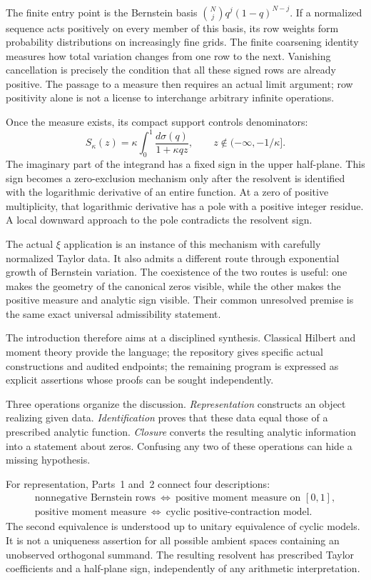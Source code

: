 The finite entry point is the Bernstein basis
$\binom Nj q^j(1-q)^{N-j}$. If a normalized sequence acts positively
on every member of this basis, its row weights form probability
distributions on increasingly fine grids. The finite coarsening
identity measures how total variation changes from one row to the
next. Vanishing cancellation is precisely the condition that all
these signed rows are already positive. The passage to a measure then
requires an actual limit argument; row positivity alone is not a
license to interchange arbitrary infinite operations.

Once the measure exists, its compact support controls denominators:
\[
 S_\kappa(z)=\kappa\int_0^1\frac{d\sigma(q)}{1+\kappa qz},
 \qquad z\notin(-\infty,-1/\kappa].
\]
The imaginary part of the integrand has a fixed sign in the upper
half-plane. This sign becomes a zero-exclusion mechanism only after
the resolvent is identified with the logarithmic derivative of an
entire function. At a zero of positive multiplicity, that logarithmic
derivative has a pole with a positive integer residue. A local
downward approach to the pole contradicts the resolvent sign.

The actual $\xi$ application is an instance of this mechanism with
carefully normalized Taylor data. It also admits a different route
through exponential growth of Bernstein variation. The coexistence
of the two routes is useful: one makes the geometry of the canonical
zeros visible, while the other makes the positive measure and analytic
sign visible. Their common unresolved premise is the same exact
universal admissibility statement.

The introduction therefore aims at a disciplined synthesis. Classical
Hilbert and moment theory provide the language; the repository gives
specific actual constructions and audited endpoints; the remaining
program is expressed as explicit assertions whose proofs can be
sought independently.

Three operations organize the discussion. \emph{Representation}
constructs an object realizing given data. \emph{Identification}
proves that these data equal those of a prescribed analytic function.
\emph{Closure} converts the resulting analytic information into a
statement about zeros. Confusing any two of these operations can hide
a missing hypothesis.

For representation, Parts~1 and~2 connect four descriptions:
\[
 \begin{gathered}
 \text{nonnegative Bernstein rows}
 \ \Longleftrightarrow\ \text{positive moment measure on }[0,1],\\
 \text{positive moment measure}
 \ \Longleftrightarrow\ \text{cyclic positive-contraction model}.
 \end{gathered}
\]
The second equivalence is understood up to unitary equivalence of
cyclic models. It is not a uniqueness assertion for all possible
ambient spaces containing an unobserved orthogonal summand.
The resulting resolvent has prescribed Taylor coefficients and a
half-plane sign, independently of any arithmetic interpretation.

